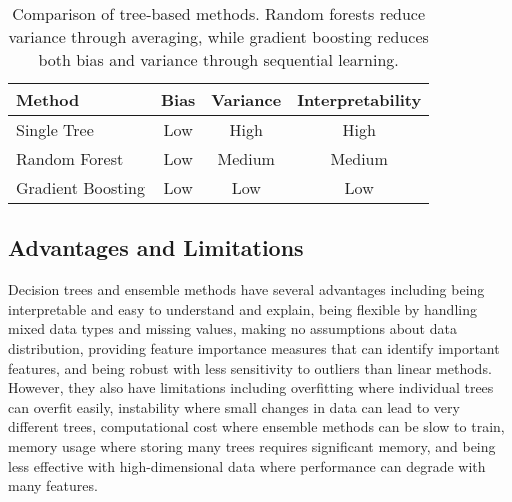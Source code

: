\begin{table}[htbp]
\centering
\begin{tabular}{lccc}
\toprule
Method & Bias & Variance & Interpretability \\
\midrule
Single Tree & Low & High & High \\
Random Forest & Low & Medium & Medium \\
Gradient Boosting & Low & Low & Low \\
\bottomrule
\end{tabular}
\caption{Comparison of tree-based methods. Random forests reduce variance through averaging, while gradient boosting reduces both bias and variance through sequential learning.}
\label{tab:ensemble-comparison}
\end{table}

\subsection{Advantages and Limitations}

Decision trees and ensemble methods have several advantages including being interpretable and easy to understand and explain, being flexible by handling mixed data types and missing values, making no assumptions about data distribution, providing feature importance measures that can identify important features, and being robust with less sensitivity to outliers than linear methods. However, they also have limitations including overfitting where individual trees can overfit easily, instability where small changes in data can lead to very different trees, computational cost where ensemble methods can be slow to train, memory usage where storing many trees requires significant memory, and being less effective with high-dimensional data where performance can degrade with many features.

